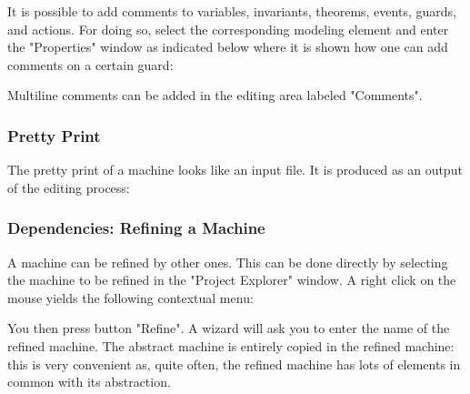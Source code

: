 It is possible to add comments to variables, invariants, theorems, events, guards, and actions. For doing so, select the corresponding modeling element and enter the "Properties" window as indicated below where it is shown how one can add comments on a certain guard: 


Multiline comments can be added in the editing area labeled "Comments". 

\subsubsection{Pretty Print}

The pretty print of a machine looks like an input file. It is produced as an output of the editing process: 


\subsubsection{Dependencies: Refining a Machine}

A machine can be refined by other ones. This can be done directly by selecting the machine to be refined in the "Project Explorer" window. A right click on the mouse yields the following contextual menu:


You then press button "Refine". A wizard will ask you to enter the name of the refined machine. The abstract machine is entirely copied in the refined machine: this is very convenient as, quite often, the refined machine has lots of elements in common with its abstraction. 


